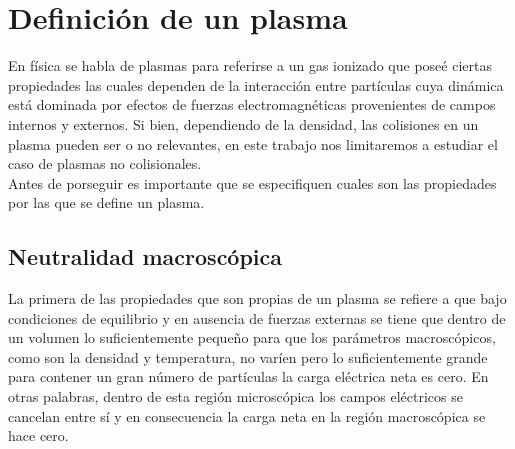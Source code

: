 \documentclass[../tesis_main_file.tex]{subfiles}
\begin{document}
\section{Definición de un plasma}
En física se habla de plasmas para referirse a un gas ionizado que poseé ciertas propiedades las cuales dependen de la interacción entre partículas cuya dinámica está dominada por efectos de fuerzas electromagnéticas provenientes de campos internos y externos.
Si bien, dependiendo de la densidad, las colisiones en un plasma pueden ser o no relevantes, en este trabajo nos limitaremos a estudiar el caso de plasmas no colisionales.\\
Antes de porseguir es importante que se especifiquen cuales son las propiedades por las que se define un plasma.
\subsection{Neutralidad macroscópica}
La primera de las propiedades que son propias de un plasma se refiere a que bajo condiciones de equilibrio y en ausencia de fuerzas externas se tiene que dentro de un volumen lo suficientemente pequeño para que los parámetros macroscópicos, como son la densidad y temperatura, no varíen pero lo suficientemente grande para contener un gran número de partículas la carga eléctrica neta es cero.
En otras palabras, dentro de esta región microscópica los campos eléctricos se cancelan entre sí y en consecuencia la carga neta en la región macroscópica se hace cero.  
\end{document}
